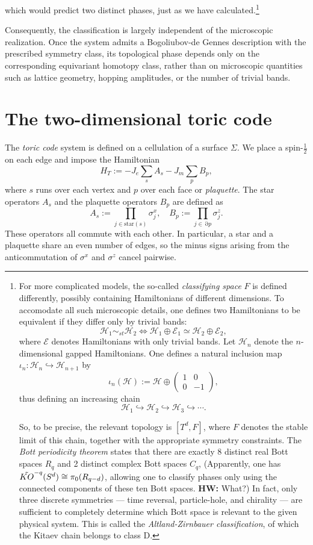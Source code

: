 \documentclass{article}
\renewcommand{\star}[1]{\mathrm{star}\left(#1\right)}
\DeclareMathOperator{\bdry}{\partial}
\newcommand{\hwnote}[1]{{\color{red}\textbf{HW:} #1}}
\begin{document}
which would predict two distinct phases, just as we have calculated.\footnote{%
For more complicated models, the so-called \emph{classifying space} $F$ is defined differently,
possibly containing Hamiltonians of different dimensions.
To accomodate all such microscopic details, one defines two Hamiltonians to be equivalent
if they differ only by trivial bands:
\[
	\mathcal{H}_1 \sim_{st} \mathcal{H}_2 \iff \mathcal{H}_1 \oplus \mathcal{E}_1 \simeq \mathcal{H}_2 \oplus \mathcal{E}_2,
\]
where $\mathcal{E}$ denotes Hamiltonians with only trivial bands.
Let $\mathscr{H}_n$ denote the $n$-dimensional gapped Hamiltonians.
One defines a natural inclusion map $\iota_n: \mathscr{H}_n \hookrightarrow \mathscr{H}_{n+1}$ by
\[
	\iota_n(\mathcal{H}) := \mathcal{H} \oplus \begin{pmatrix} 1 & 0 \\ 0 & -1 \end{pmatrix},
\]
thus defining an increasing chain
\[
	\mathscr{H}_1 \hookrightarrow \mathscr{H}_2 \hookrightarrow \mathscr{H}_3 \hookrightarrow \cdots.
\]

So, to be precise, the relevant topology is $[T^d, F]$, where $F$ denotes the stable limit of this chain,
together with the appropriate symmetry constraints.
The \emph{Bott periodicity theorem} states that there are exactly 8 distinct real Bott spaces $R_q$
and 2 distinct complex Bott spaces $C_q$,
(Apparently, one has $\Tilde{KO}^{-q}(S^d) \cong \pi_0(R_{q-d})$,
allowing one to classify phases only using the connected components of these ten Bott spaces.
\hwnote{What?})
In fact, only three discrete symmetries --- time reversal, particle-hole, and chirality --- are sufficient
to completely determine which Bott space is relevant to the given physical system.
This is called the \emph{Altland-Zirnbauer classification}, of which the Kitaev chain belongs to class D.
}

Consequently, the classification is largely independent of the microscopic realization.
Once the system admits a Bogoliubov-de Gennes description with the prescribed symmetry class,
its topological phase depends only on the corresponding equivariant homotopy class,
rather than on microscopic quantities such as lattice geometry, hopping amplitudes, or the number of trivial bands.

\section{The two-dimensional toric code}
The \emph{toric code} system is defined on a cellulation of a surface $\Sigma$.
We place a spin-$\frac{1}{2}$ on each edge and impose the Hamiltonian
\[
	H_T := -J_e \sum_s A_s - J_m \sum_p B_p,
\]
where $s$ runs over each vertex and $p$ over each face or \emph{plaquette}.
The star operators $A_s$ and the plaquette operators $B_p$ are defined as
\[
	A_s := \prod_{j \in \star{s}} \sigma_j^x,\quad
	B_p := \prod_{j \in \bdry{p}} \sigma_j^z.
\]
These operators all commute with each other.
In particular, a star and a plaquette share an even number of edges,
so the minus signs arising from the anticommutation of $\sigma^x$ and $\sigma^z$ cancel pairwise.
\end{document}
